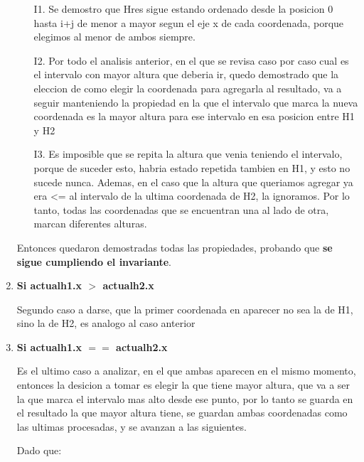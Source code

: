 \documentclass[10pt,a4paper]{article}
\begin{document}
\begin{enumerate}
\begin{itemize}
\item[I1.] Se demostro que Hres sigue estando ordenado desde la posicion 0 hasta i+j de menor a mayor segun el eje x de cada coordenada, porque elegimos al menor de ambos siempre.
\item[I2.] Por todo el analisis anterior, en el que se revisa caso por caso cual es el intervalo con mayor altura que deberia ir, quedo demostrado que la eleccion de como elegir la coordenada para agregarla al resultado, va a seguir manteniendo la propiedad en la que el intervalo que marca la nueva coordenada es la mayor altura para ese intervalo en esa posicion entre H1 y H2
\item[I3.] Es imposible que se repita la altura que venia teniendo el intervalo, porque de suceder esto, habria estado repetida tambien en H1, y esto no sucede nunca. Ademas, en el caso que la altura que queriamos agregar ya era <= al intervalo de la ultima coordenada de H2, la ignoramos. Por lo tanto, todas las coordenadas que se encuentran una al lado de otra, marcan diferentes alturas.
\end{itemize}

Entonces quedaron demostradas todas las propiedades, probando que \textbf{se sigue cumpliendo el invariante}.\\

\item \textbf{Si actualh1.x $>$ actualh2.x}

Segundo caso a darse, que la primer coordenada en aparecer no sea la de H1, sino la de H2, es analogo al caso anterior\\

\item \textbf{Si actualh1.x $==$ actualh2.x}

Es el ultimo caso a analizar, en el que ambas aparecen en el mismo momento, entonces la desicion a tomar es elegir la que tiene mayor altura, que va a ser la que marca el intervalo mas alto desde ese punto, por lo tanto se guarda en el resultado la que mayor altura tiene, se guardan ambas coordenadas como las ultimas procesadas, y se avanzan a las siguientes. 

Dado que:


\end{enumerate}
\end{document}
